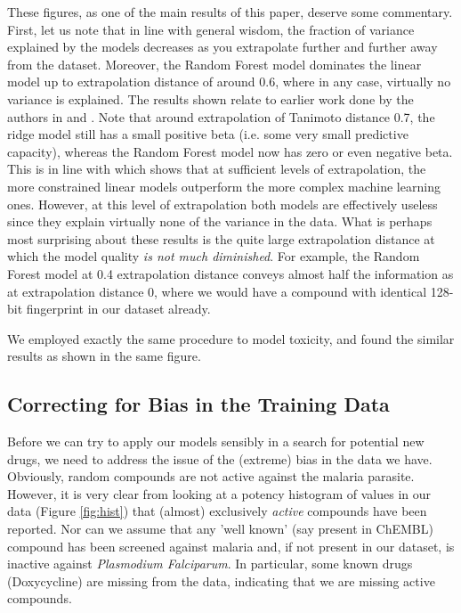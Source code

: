 \documentclass{article}
\begin{document}
These figures, as one of the main results of this paper, deserve some commentary. First, let us note that in line with general wisdom, the fraction of variance explained by the models decreases as you extrapolate further and further away from the dataset.  Moreover, the Random Forest model dominates the linear model up to extrapolation distance of around 0.6, where in any case, virtually no variance is explained.
\newline
\newline
The results shown relate to earlier work done by the authors in \citep{et0:} and \citep{et1:}.  Note that around extrapolation of Tanimoto distance 0.7, the ridge model still has a small positive beta (i.e. some very small predictive capacity), whereas the Random Forest model now has zero or even negative beta.  This is in line with \citep{et1:} which shows that at sufficient levels of extrapolation, the more constrained linear models outperform the more complex machine learning ones.  However, at this level of extrapolation both models are effectively useless since they explain virtually none of the variance in the data.  
\newline
\newline
What is perhaps most surprising about these results is the quite large extrapolation distance at which the model quality \textit{is not much diminished}.  For example, the Random Forest model at 0.4 extrapolation distance conveys almost half the information as at extrapolation distance 0, where we would have a compound with identical 128-bit fingerprint in our dataset already.

We  employed exactly the same procedure to model toxicity, and found the similar results as shown in the same figure.


\subsection{Correcting for Bias in the Training Data}

Before we can try to apply our models sensibly in a search for potential new drugs, we need to address the issue of the (extreme) bias in the data we have.  Obviously, random compounds are not active against the malaria parasite.  However, it is very clear from looking at a potency histogram of values in our data (Figure \ref{fig:hist}) that (almost) exclusively \textit{active} compounds have been reported.  Nor can we assume that any 'well known' (say present in ChEMBL) compound has been screened against malaria and, if not present in our dataset, is inactive against \textit{Plasmodium Falciparum}.  In particular, some known drugs (Doxycycline) are missing from the data, indicating that we are missing active compounds.
\end{document}
